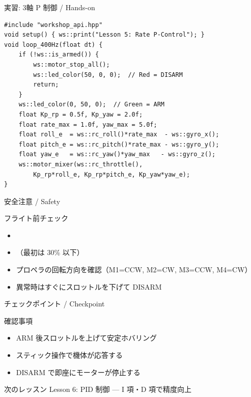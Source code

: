 \documentclass[aspectratio=169, 14pt]{beamer}
\begin{document}
\begin{frame}[fragile]{実習: 3軸 P 制御 / Hands-on}
  \begin{lstlisting}[style=sfcpp, title={user\_code.cpp}]
#include "workshop_api.hpp"
void setup() { ws::print("Lesson 5: Rate P-Control"); }
void loop_400Hz(float dt) {
    if (!ws::is_armed()) {
        ws::motor_stop_all();
        ws::led_color(50, 0, 0);  // Red = DISARM
        return;
    }
    ws::led_color(0, 50, 0);  // Green = ARM
    float Kp_rp = 0.5f, Kp_yaw = 2.0f;
    float rate_max = 1.0f, yaw_max = 5.0f;
    float roll_e  = ws::rc_roll()*rate_max  - ws::gyro_x();
    float pitch_e = ws::rc_pitch()*rate_max - ws::gyro_y();
    float yaw_e   = ws::rc_yaw()*yaw_max   - ws::gyro_z();
    ws::motor_mixer(ws::rc_throttle(),
        Kp_rp*roll_e, Kp_rp*pitch_e, Kp_yaw*yaw_e);
}
  \end{lstlisting}
\end{frame}

\begin{frame}{安全注意 / Safety}
  \begin{alertblock}{フライト前チェック}
    \begin{itemize}
      \item[$\square$] 
      \item[$\square$] （最初は 30\% 以下）
      \item[$\square$] プロペラの回転方向を確認（M1=CCW, M2=CW, M3=CCW, M4=CW）
      \item[$\square$] 異常時はすぐにスロットルを下げて DISARM
    \end{itemize}
  \end{alertblock}
\end{frame}

\begin{frame}{チェックポイント / Checkpoint}
  \begin{alertblock}{確認事項}
    \begin{itemize}
      \item[$\square$] ARM 後スロットルを上げて安定ホバリング
      \item[$\square$] スティック操作で機体が応答する
      \item[$\square$] DISARM で即座にモーターが停止する
    \end{itemize}
  \end{alertblock}

  \vspace{1em}

  \begin{block}{次のレッスン}
    Lesson 6: PID 制御 --- I 項・D 項で精度向上
  \end{block}
\end{frame}
\end{document}
